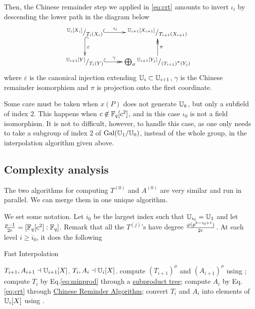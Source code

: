 Then, the Chinese remainder step we applied in \eqref{eq:crt} amounts
to invert $\iota_i$ by descending the lower path in the diagram below
\begin{equation}
  \xymatrix{
    ^{\U_i[X_i]}/_{T_i(X_i)} \ar@{^{(}->}[r]^-{\iota_i} \ar@{^{(}->}[d]^{\varepsilon} &
    ^{\U_{i+1}[X_{i+1}]}/_{T_{i+1}(X_{i+1})} \\
    ^{\U_{i+1}[Y]}/_{T_i(Y)} \ar@{^{(}->>}[r]^-{\gamma} &
    \bigoplus_\sigma {}^{\U_{i+1}[Y_{j}]}/_{\left(T_{i+1}\right)^\sigma(Y_{j})} \ar@{->>}[u]_{\pi}
  }
\end{equation}
where $\varepsilon$ is the canonical injection extending
$\mathbb{U}_i\subset\mathbb{U}_{i+1}$, $\gamma$ is the Chinese remainder isomorphism
and $\pi$ is projection onto the first coordinate.

Some care must be taken when $x(P)$ does not generate $\mathbb{U}_k$, but only
a subfield of index $2$. This happens when $c\not\in\mathbb{F}_q[c^2]$, and in
this case $\iota_0$ is not a field isomorphism. It is not to
difficult, however, to handle this case, as one only needs to take a
subgroup of index $2$ of $\operatorname{Gal}(\mathbb{U}_1/\mathbb{U}_0)$, instead of the whole
group, in the interpolation algorithm given above.


\subsection{Complexity analysis}
\label{sec:C2-AS-FI:complexity}

The two algorithms for computing $T^{(0)}$ and $A^{(0)}$ are very
similar and run in parallel. We can merge them in one unique
algorithm.

We set some notation. Let $i_0$ be the largest index such that
$\mathbb{U}_{i_0} = \mathbb{U}_1$ and let $\frac{p-1}{2r} = [\mathbb{F}_q[c^2]:\mathbb{F}_q]$.  Remark
that all the $T^{(j)}$'s have degree $\frac{\varphi(p^{k-i_0+1})}{2r}$.
At each level $i\ge i_0$, it does the following

\begin{algorithm}
  \caption{Fast Interpolation}
  \begin{algorithmic}[1]
    \REQUIRE $T_{i+1},A_{i+1}\dashv\mathbb{U}_{i+1}[X]$.
    \ENSURE $T_i,A_i\dashv\mathbb{U}_i[X]$.
    \STATE\label{alg:T:gal} compute $\left(T_{i+1}\right)^\sigma$ and $\left(A_{i+1}\right)^\sigma$ using ;
    \ENDFOR
    \STATE\label{alg:T:prod} compute $T_i$ by Eq.\eqref{eq:minprod}
    through a \hyperref[sec:chin-rema-algor]{subproduct tree};
    \STATE\label{alg:A:CRA} compute $A_i$ by Eq.\eqref{eq:crt} through
    \hyperref[sec:chin-rema-algor]{Chinese Reminder Algorithm};
    \STATE\label{alg:T:push} convert $T_i$ and $A_i$ into elements of
    $\mathbb{U}_i[X]$ using .
  \end{algorithmic}
\end{algorithm}

